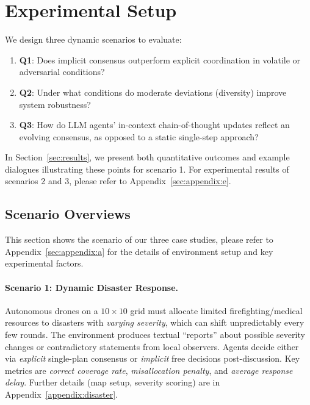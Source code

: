 \section{Experimental Setup}
\label{sec:experiments}

We design three dynamic scenarios to evaluate:
\begin{enumerate}[itemsep=1pt, parsep=1pt, leftmargin=*]
    \item \textbf{Q1}: Does implicit consensus outperform explicit coordination in volatile or adversarial conditions?
    \item \textbf{Q2}: Under what conditions do moderate deviations (diversity) improve system robustness?
    \item \textbf{Q3}: How do LLM agents’ in-context chain-of-thought updates reflect an evolving consensus, as opposed to a static single-step approach?
\end{enumerate}
In Section~\ref{sec:results}, we present both quantitative outcomes and example dialogues illustrating these points for scenario 1. For experimental results of scenarios 2 and 3, please refer to Appendix~\ref{sec:appendix:e}.

\subsection{Scenario Overviews}

This section shows the scenario of our three case studies, please refer to Appendix~\ref{sec:appendix:a} for the details of environment setup and key experimental factors.

\paragraph{Scenario 1: Dynamic Disaster Response.}
Autonomous drones on a $10\times10$ grid must allocate limited firefighting/medical resources to disasters with \emph{varying severity}, which can shift unpredictably every few rounds. The environment produces textual “reports” about possible severity changes or contradictory statements from local observers. Agents decide either via \emph{explicit} single-plan consensus or \emph{implicit} free decisions post-discussion. Key metrics are \emph{correct coverage rate}, \emph{misallocation penalty}, and \emph{average response delay}. Further details (map setup, severity scoring) are in Appendix~\ref{appendix:disaster}.

